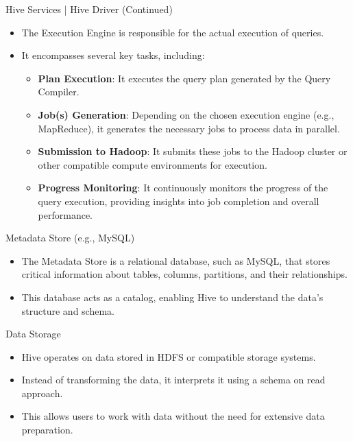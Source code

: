 \begin{frame}{Hive Services | Hive Driver (Continued)}
\begin{itemize}
    \item The Execution Engine is responsible for the actual execution of queries.
    \item It encompasses several key tasks, including:
    \begin{itemize}
        \item \textbf{Plan Execution}: It executes the query plan generated by the Query Compiler.
        \item \textbf{Job(s) Generation}: Depending on the chosen execution engine (e.g., MapReduce), it generates the necessary jobs to process data in parallel.
        \item \textbf{Submission to Hadoop}: It submits these jobs to the Hadoop cluster or other compatible compute environments for execution.
        \item \textbf{Progress Monitoring}: It continuously monitors the progress of the query execution, providing insights into job completion and overall performance.
    \end{itemize}
\end{itemize}
\end{frame}



\begin{frame}{Metadata Store (e.g., MySQL)}
	\begin{itemize}
		\item The Metadata Store is a relational database, such as MySQL, that stores critical information about tables, columns, partitions, and their relationships.
		\item This database acts as a catalog, enabling Hive to understand the data's structure and schema.
	\end{itemize}
\end{frame}

\begin{frame}{Data Storage}
\begin{itemize}
    \item Hive operates on data stored in HDFS or compatible storage systems.
    \item Instead of transforming the data, it interprets it using a schema on read approach.
    \item This allows users to work with data without the need for extensive data preparation.
\end{itemize}
\end{frame}
